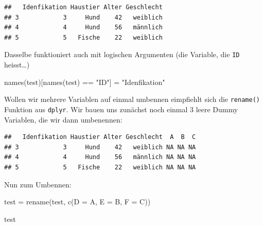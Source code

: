 \documentclass[
]{book}
\newenvironment{Shaded}{\begin{snugshade}}{\end{snugshade}}
\newcommand{\AttributeTok}[1]{\textcolor[rgb]{0.77,0.63,0.00}{#1}}
\newcommand{\ConstantTok}[1]{\textcolor[rgb]{0.00,0.00,0.00}{#1}}
\newcommand{\FunctionTok}[1]{\textcolor[rgb]{0.00,0.00,0.00}{#1}}
\newcommand{\NormalTok}[1]{#1}
\newcommand{\OtherTok}[1]{\textcolor[rgb]{0.56,0.35,0.01}{#1}}
\newcommand{\SpecialCharTok}[1]{\textcolor[rgb]{0.00,0.00,0.00}{#1}}
\newcommand{\StringTok}[1]{\textcolor[rgb]{0.31,0.60,0.02}{#1}}
\begin{document}
\begin{verbatim}
##   Idenfikation Haustier Alter Geschlecht
## 3            3     Hund    42   weiblich
## 4            4     Hund    56   männlich
## 5            5   Fische    22   weiblich
\end{verbatim}

Dasselbe funktioniert auch mit logischen Argumenten (die Variable, die \texttt{ID} heisst\ldots)

\begin{Shaded}
\begin{Highlighting}[]
\FunctionTok{names}\NormalTok{(test)[}\FunctionTok{names}\NormalTok{(test) }\SpecialCharTok{==} \StringTok{"ID"}\NormalTok{] }\OtherTok{=} \StringTok{"Idenfikation"}
\end{Highlighting}
\end{Shaded}

Wollen wir mehrere Variablen auf einmal umbennen eimpfiehlt sich die \texttt{rename()} Funktion aus \texttt{dplyr}. Wir bauen uns zunächst noch einmal 3 leere Dummy Variablen, die wir dann umbenennen:

\begin{Shaded}
\end{Shaded}

\begin{verbatim}
##   Idenfikation Haustier Alter Geschlecht  A  B  C
## 3            3     Hund    42   weiblich NA NA NA
## 4            4     Hund    56   männlich NA NA NA
## 5            5   Fische    22   weiblich NA NA NA
\end{verbatim}

Nun zum Umbennen:

\begin{Shaded}
\begin{Highlighting}[]
\NormalTok{test }\OtherTok{=} \FunctionTok{rename}\NormalTok{(test, }\FunctionTok{c}\NormalTok{(}\AttributeTok{D =}\NormalTok{ A, }
                      \AttributeTok{E =}\NormalTok{ B,}
                      \AttributeTok{F =}\NormalTok{ C))}

\NormalTok{test}
\end{Highlighting}
\end{Shaded}
\end{document}
